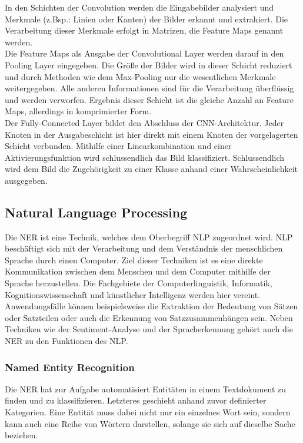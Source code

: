 In den Schichten der Convolution werden die Eingabebilder analysiert und Merkmale (z.Bsp.: Linien oder Kanten) der Bilder erkannt und extrahiert.
Die Verarbeitung dieser Merkmale erfolgt in Matrizen, die Feature Maps genannt werden. \\
Die Feature Maps als Ausgabe der Convolutional Layer werden darauf in den Pooling Layer eingegeben.
Die Größe der Bilder wird in dieser Schicht reduziert und durch Methoden wie dem Max-Pooling nur die wesentlichen Merkmale weitergegeben.
Alle anderen Informationen sind für die Verarbeitung überflüssig und werden verworfen.  Ergebnis dieser Schicht ist die gleiche Anzahl an Feature Maps, allerdings in komprimierter Form. \\
Der Fully-Connected Layer bildet den Abschluss der \ac{CNN}-Architektur. Jeder Knoten in der Ausgabeschicht ist hier direkt mit einem Knoten der vorgelagerten Schicht verbunden.
Mithilfe einer Linearkombination und einer Aktivierungsfunktion wird schlussendlich das Bild klassifiziert. Schlussendlich wird dem Bild die Zugehörigkeit zu einer Klasse anhand einer Wahrscheinlichkeit ausgegeben.

\subsection{Natural Language Processing}
Die \acl{NER} ist eine Technik, welches dem Oberbegriff \acl{NLP} zugeordnet wird. \ac{NLP} beschäftigt sich mit der Verarbeitung und dem Verständnis der menschlichen Sprache durch einen Computer.
Ziel dieser Techniken ist es eine direkte Kommunikation zwischen dem Menschen und dem Computer mithilfe der Sprache herzustellen. Die Fachgebiete der Computerlinguistik, Informatik, Kognitionswissenschaft und künstlicher Intelligenz werden hier vereint.
Anwendungsfälle können beispielsweise die Extraktion der Bedeutung von Sätzen oder Satzteilen oder auch die Erkennung von Satzzusammenhängen sein.   Neben Techniken wie der Sentiment-Analyse und der Spracherkennung gehört auch die \acl{NER} zu den Funktionen des \ac{NLP}.

\subsubsection{Named Entity Recognition}
Die \acl{NER} hat zur Aufgabe automatisiert Entitäten in einem Textdokument zu finden und zu klassifizieren. Letzteres geschieht anhand zuvor definierter Kategorien.
Eine Entität muss dabei nicht nur ein einzelnes Wort sein, sondern kann auch eine Reihe von Wörtern darstellen, solange sie sich auf dieselbe Sache beziehen.

